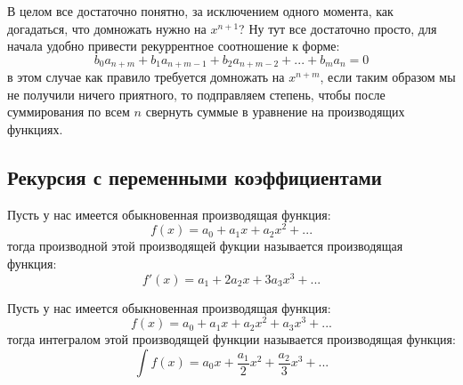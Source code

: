 В целом все достаточно понятно, за исключением одного момента, как догадаться, что домножать нужно на $x^{n+1}$? Ну тут все достаточно просто, для начала удобно привести рекуррентное соотношение к форме:
\[
	b_0 a_{n+m} + b_1 a_{n+m-1} + b_2 a_{n+m-2} + ... + b_m a_{n} = 0
\]
в этом случае как правило требуется домножать на $x^{n+m}$, если таким образом мы не получили ничего приятного, то подправляем степень, чтобы после суммирования по всем $n$ свернуть суммые в уравнение на производящих функциях.

\subsection{Рекурсия с переменными коэффициентами}

\begin{Def}
Пусть у нас имеется обыкновенная производящая функция:
\[
	f\left(x\right) = a_0 + a_1 x + a_2 x^2 + ...
\]
тогда производной этой производящей фукции называется производящая функция:
\[
	f'\left(x\right) = a_1 + 2 a_2 x + 3 a_3 x^3 + ...
\]
\end{Def}

\begin{Def}
Пусть у нас имеется обыкновенная производящая функция:
\[
	f\left(x\right) = a_0 + a_1 x + a_2 x^2 + a_3 x^3 + ...
\]
тогда интегралом этой производящей функции называется производящая функция:
\[
	\int f\left(x\right) = a_0 x + \frac{a_1}{2} x^2 + \frac{a_2}{3} x^3 + ...
\]
\end{Def}

